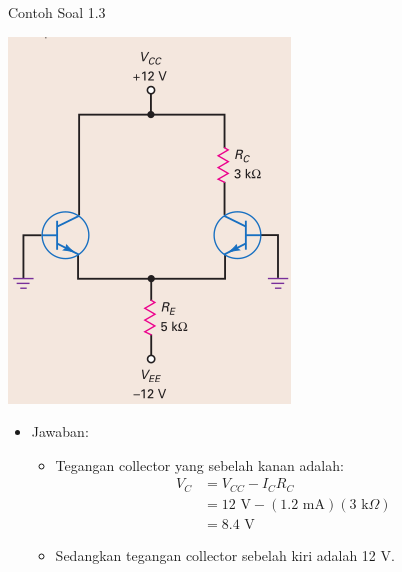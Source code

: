 \documentclass[aspectratio=169]{beamer}
\begin{document}
\begin{frame}{Contoh Soal 1.3}
	\begin{multicols}{2}
		\begin{center}
			\includegraphics[width=0.6\textheight]{gambar/01.latihan_soal_3}
		\end{center}
		\columnbreak
		\begin{itemize}
			\item Jawaban:
			\begin{itemize}
				\item Tegangan collector yang sebelah kanan adalah:
				\begin{align*}
					V_C &= V_{CC} - I_C R_C \\
					&= 12 \text{ V} - (1.2 \text{ mA})(3 \text{ k}\Omega) \\
					&= 8.4 \text{ V}
				\end{align*}
				\item Sedangkan tegangan collector sebelah kiri adalah 12 V.
			\end{itemize}
		\end{itemize}
		\vfill\null
	\end{multicols}
\end{frame}
\end{document}
